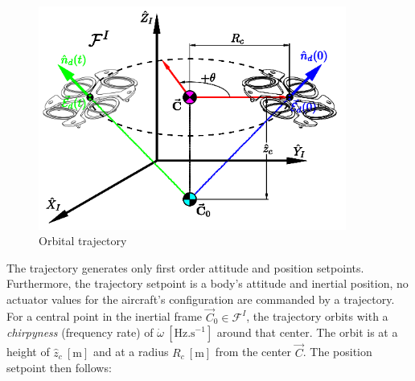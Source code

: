 \begin{figure}[htbp]
\vspace{-10pt}
\centering
\includegraphics[width=0.9\textwidth]{figs/trajectory}
\vspace{-12pt}
\caption{Orbital trajectory}
\label{fig:trajectory}
\vspace{-20pt}
\end{figure}
\par
The trajectory generates only first order attitude and position setpoints. Furthermore, the trajectory setpoint is a body's attitude and inertial position, no actuator values for the aircraft's configuration are commanded by a trajectory. For a central point in the inertial frame $\vec{C}_0\in\mathcal{F}^I$, the trajectory orbits with a \emph{chirpyness} (frequency rate) of $\dot{\omega}~[\text{Hz.s}^{-1}]$ around that center. The orbit is at a height of $\hat{z}_c~[\text{m}]$ and at a radius $R_c~[\text{m}]$ from the center $\vec{C}$. The position setpoint then follows:
